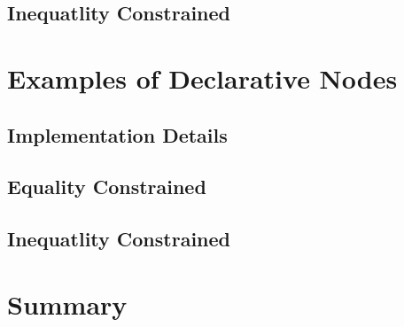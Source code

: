 \subsection{Inequatlity Constrained}

\section{Examples of Declarative Nodes}
\label{sec:example}

\subsection{Implementation Details}
\subsection{Equality Constrained}

\subsection{Inequatlity Constrained}

\section{Summary}
